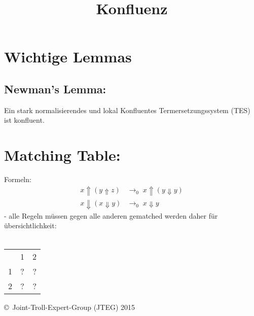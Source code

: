 \documentclass{article}
\title{Konfluenz}
\date{ }
\begin{document}
	\section*{Wichtige Lemmas}
		\subsection*{Newman's Lemma:}
			Ein stark normalisierendes und lokal Konfluentes Termersetzungssystem (TES) ist konfluent.
		\subsection*{}
		\section{Matching Table:}
			Formeln:
			\begin{align}
				x \Uparrow ( y \Uparrow z) & \rightarrow_{0}
					\; x \Uparrow (y \Downarrow y)
				\\				
				x \Downarrow ( x \Downarrow y ) & \rightarrow_0
					\; x \Downarrow y
			\end{align}
			- alle Regeln m\"ussen gegen alle anderen gematched werden 
			daher f\"ur \"ubersichtlichkeit:\\ \\
			\begin{tabular}{l c r}
				  & 1 & 2 \\
				1 & ? & ? \\
				2 & ? & ? \\
			\end{tabular}		
		
		
		
		
		
		
		
		
		
		
		
		
		
		
		
		
	
		
		
		
	\begin{tiny}
	\copyright\ Joint-Troll-Expert-Group (JTEG) 2015
	\end{tiny}
\end{document}
